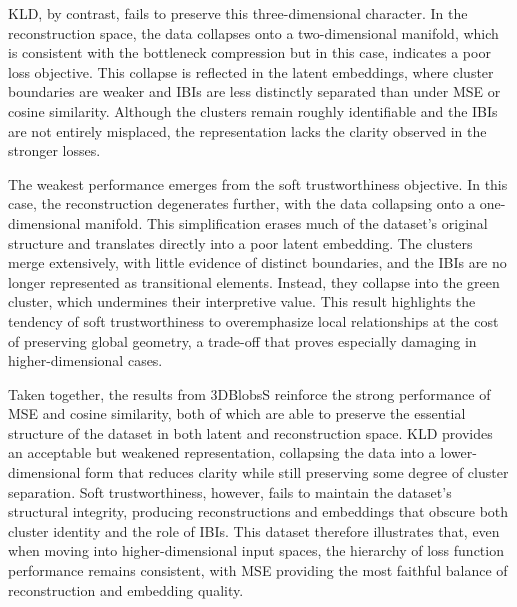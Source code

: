 KLD, by contrast, fails to preserve this three-dimensional character. In the reconstruction space, the data collapses onto a two-dimensional manifold, which is consistent with the bottleneck compression but in this case, indicates a poor loss objective. This collapse is reflected in the latent embeddings, where cluster boundaries are weaker and IBIs are less distinctly separated than under MSE or cosine similarity. Although the clusters remain roughly identifiable and the IBIs are not entirely misplaced, the representation lacks the clarity observed in the stronger losses.

The weakest performance emerges from the soft trustworthiness objective. In this case, the reconstruction degenerates further, with the data collapsing onto a one-dimensional manifold. This simplification erases much of the dataset’s original structure and translates directly into a poor latent embedding. The clusters merge extensively, with little evidence of distinct boundaries, and the IBIs are no longer represented as transitional elements. Instead, they collapse into the green cluster, which undermines their interpretive value. This result highlights the tendency of soft trustworthiness to overemphasize local relationships at the cost of preserving global geometry, a trade-off that proves especially damaging in higher-dimensional cases.

Taken together, the results from 3DBlobsS reinforce the strong performance of MSE and cosine similarity, both of which are able to preserve the essential structure of the dataset in both latent and reconstruction space. KLD provides an acceptable but weakened representation, collapsing the data into a lower-dimensional form that reduces clarity while still preserving some degree of cluster separation. Soft trustworthiness, however, fails to maintain the dataset’s structural integrity, producing reconstructions and embeddings that obscure both cluster identity and the role of IBIs. This dataset therefore illustrates that, even when moving into higher-dimensional input spaces, the hierarchy of loss function performance remains consistent, with MSE providing the most faithful balance of reconstruction and embedding quality.

